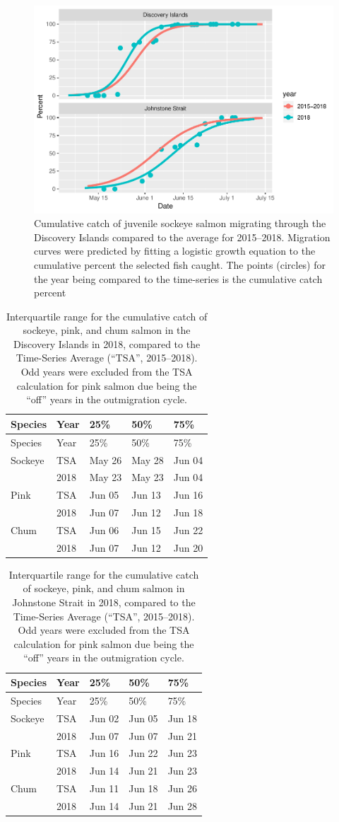 \documentclass[fleqn,10pt]{wlpeerj} %
\begin{document}
\begin{figure}
\includegraphics[width=0.8\linewidth]{peer_j_migration_dynamics_files/figure-latex/mt-1} \caption{Cumulative catch of juvenile sockeye salmon migrating through the Discovery Islands compared to the average for 2015--2018. Migration curves were predicted by fitting a logistic growth equation to the cumulative percent the selected fish caught. The points (circles) for the year being compared to the time-series is the cumulative catch percent}\label{fig:mt}
\end{figure}

\begin{longtable}[]{@{}lllll@{}}
\caption{\label{tab:mtdi} Interquartile range for the cumulative catch of
sockeye, pink, and chum salmon in the Discovery Islands in 2018,
compared to the Time-Series Average (``TSA'', 2015--2018). Odd years
were excluded from the TSA calculation for pink salmon due being the
``off'' years in the outmigration cycle.}\tabularnewline
\toprule
Species & Year & 25\% & 50\% & 75\%\tabularnewline
\midrule
\endfirsthead
\toprule
Species & Year & 25\% & 50\% & 75\%\tabularnewline
\midrule
\endhead
Sockeye & TSA & May 26 & May 28 & Jun 04\tabularnewline
~ & 2018 & May 23 & May 23 & Jun 04\tabularnewline
Pink & TSA & Jun 05 & Jun 13 & Jun 16\tabularnewline
~ & 2018 & Jun 07 & Jun 12 & Jun 18\tabularnewline
Chum & TSA & Jun 06 & Jun 15 & Jun 22\tabularnewline
~ & 2018 & Jun 07 & Jun 12 & Jun 20\tabularnewline
\bottomrule
\end{longtable}

\begin{longtable}[]{@{}lllll@{}}
\caption{\label{tab:mtjs} Interquartile range for the cumulative catch of
sockeye, pink, and chum salmon in Johnstone Strait in 2018, compared to
the Time-Series Average (``TSA'', 2015--2018). Odd years were excluded
from the TSA calculation for pink salmon due being the ``off'' years in
the outmigration cycle.}\tabularnewline
\toprule
Species & Year & 25\% & 50\% & 75\%\tabularnewline
\midrule
\endfirsthead
\toprule
Species & Year & 25\% & 50\% & 75\%\tabularnewline
\midrule
\endhead
Sockeye & TSA & Jun 02 & Jun 05 & Jun 18\tabularnewline
~ & 2018 & Jun 07 & Jun 07 & Jun 21\tabularnewline
Pink & TSA & Jun 16 & Jun 22 & Jun 23\tabularnewline
~ & 2018 & Jun 14 & Jun 21 & Jun 23\tabularnewline
Chum & TSA & Jun 11 & Jun 18 & Jun 26\tabularnewline
~ & 2018 & Jun 14 & Jun 21 & Jun 28\tabularnewline
\bottomrule
\end{longtable}
\end{document}
